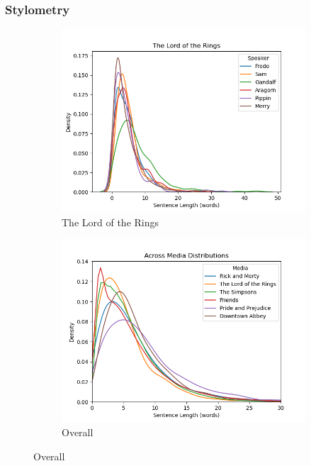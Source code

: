 \documentclass{article}
\begin{document}
\begin{titlepage}
\subsubsection{Stylometry}

\begin{figure}[H]
    \centering
    \caption{Within- and Across- Media Sentence Length Distributions}
    \begin{subfigure}[b]{0.45\textwidth}
        \centering
        \includegraphics[width=\textwidth]{images/The Lord of the Rings_sentence_length.png}
        \caption{The Lord of the Rings}
        \label{fig:subfig1}
    \end{subfigure}
    \hfill
    \begin{subfigure}[b]{0.45\textwidth}
        \centering
        \includegraphics[width=\textwidth]{images/overall_sentence_length.png}
        \caption{Overall}
        \label{fig:subfig2}
    \end{subfigure}
    \label{fig:main}
\end{figure} 


\end{titlepage}
\end{document}
